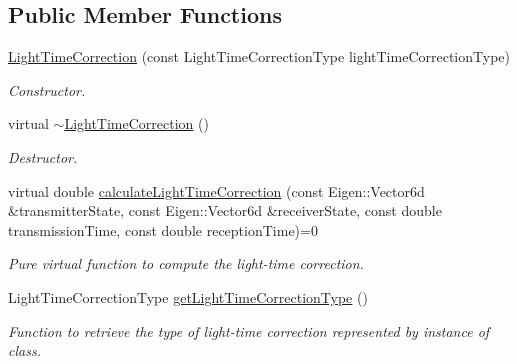 \subsection*{Public Member Functions}
\begin{DoxyCompactItemize}
\item 
\hyperlink{classtudat_1_1observation__models_1_1LightTimeCorrection_a20cb0650b967cd964bbe81a2764078bf}{Light\+Time\+Correction} (const Light\+Time\+Correction\+Type light\+Time\+Correction\+Type)
\begin{DoxyCompactList}\small\item\em Constructor. \end{DoxyCompactList}\item 
virtual \hyperlink{classtudat_1_1observation__models_1_1LightTimeCorrection_ab60099af529c7966175180888fa00e7e}{$\sim$\+Light\+Time\+Correction} ()\hypertarget{classtudat_1_1observation__models_1_1LightTimeCorrection_ab60099af529c7966175180888fa00e7e}{}\label{classtudat_1_1observation__models_1_1LightTimeCorrection_ab60099af529c7966175180888fa00e7e}

\begin{DoxyCompactList}\small\item\em Destructor. \end{DoxyCompactList}\item 
virtual double \hyperlink{classtudat_1_1observation__models_1_1LightTimeCorrection_a75c56b78e1603b14387991fdfffac1ce}{calculate\+Light\+Time\+Correction} (const Eigen\+::\+Vector6d \&transmitter\+State, const Eigen\+::\+Vector6d \&receiver\+State, const double transmission\+Time, const double reception\+Time)=0
\begin{DoxyCompactList}\small\item\em Pure virtual function to compute the light-\/time correction. \end{DoxyCompactList}\item 
Light\+Time\+Correction\+Type \hyperlink{classtudat_1_1observation__models_1_1LightTimeCorrection_a737da4f572539d1fa8e80dfbaf2b2074}{get\+Light\+Time\+Correction\+Type} ()
\begin{DoxyCompactList}\small\item\em Function to retrieve the type of light-\/time correction represented by instance of class. \end{DoxyCompactList}\end{DoxyCompactItemize}
